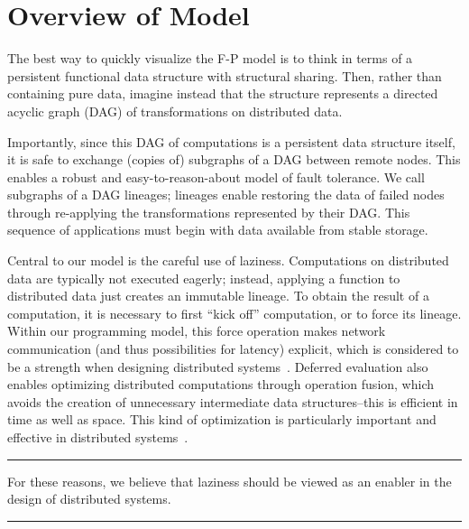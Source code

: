 \documentclass[preprint]{sigplanconf}
\theoremstyle{definition}
\theoremstyle{definition}
\begin{document}
\section{Overview of Model}

The best way to quickly visualize the F-P model is to think in terms of a
persistent functional data structure with structural sharing. Then, rather
than containing pure data, imagine instead that the structure represents a
directed acyclic graph (DAG) of transformations on distributed data.

Importantly, since this DAG of computations is a persistent data structure
itself, it is safe to exchange (copies of) subgraphs of a DAG between remote
nodes. This enables a robust and easy-to-reason-about model of fault
tolerance. We call subgraphs of a DAG lineages; lineages enable restoring the
data of failed nodes through re-applying the transformations represented by
their DAG. This sequence of applications must begin with data available from
stable storage.

Central to our model is the careful use of laziness. Computations on
distributed data are typically not executed eagerly; instead, applying a
function to distributed data just creates an immutable lineage. To obtain the
result of a computation, it is necessary to first ``kick off'' computation, or
to force its lineage. Within our programming model, this force
operation makes network communication (and thus
possibilities for latency) explicit, which is considered to be a strength when
designing distributed systems~\cite{ANoteDistComp}. Deferred evaluation also
enables optimizing distributed computations through operation fusion, which
avoids the creation of unnecessary intermediate data structures--this is
efficient in time as well as space. This kind of optimization is particularly
important and effective in distributed systems~\cite{FlumeJava}.

\vspace{-3mm}
\begin{center}\noindent\rule{8cm}{0.4pt}\end{center}
\begin{displayquote}
For these reasons, we believe that laziness should be viewed as an enabler in
the design of distributed systems.
\end{displayquote}
\vspace{-4mm}
\begin{center}\noindent\rule{8cm}{0.4pt}\end{center}
\vspace{1mm}
\end{document}
